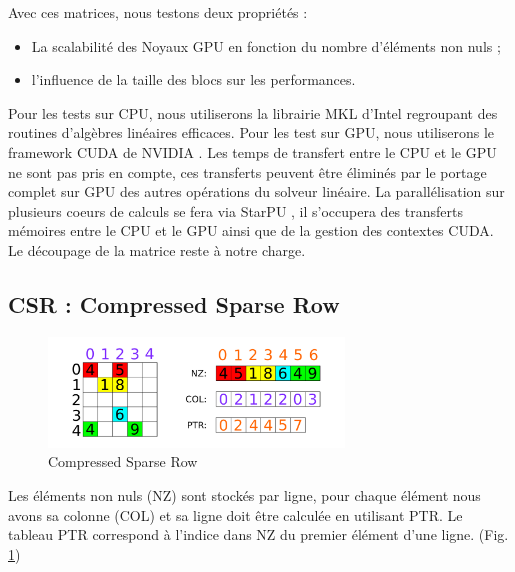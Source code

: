 \documentclass[renpar]{compas2013}
\begin{document}
    Avec ces matrices, nous testons deux propriétés :
    \begin{itemize}
      \item La scalabilité des Noyaux GPU en fonction du nombre d'éléments non nuls ;
      \item l'influence de la taille des blocs sur les performances.
    \end{itemize}
    
    Pour les tests sur CPU, nous utiliserons la librairie MKL d'Intel \cite{MKL} regroupant des
    routines d'algèbres linéaires efficaces. Pour les test sur GPU, nous utiliserons
    le framework CUDA de NVIDIA \cite{CUDA}. Les temps de transfert entre le CPU et le GPU ne sont
    pas pris en compte, ces transferts peuvent être éliminés par le portage complet sur GPU des
    autres opérations du solveur linéaire. La parallélisation sur plusieurs coeurs de calculs
    se fera via StarPU \cite{AugThiNamWac11CCPE}, il s'occupera des transferts mémoires entre le CPU
    et le GPU ainsi que de la gestion des contextes CUDA. Le découpage de la matrice reste à notre charge.
    
    
    \subsection{CSR : Compressed Sparse Row}
    
    \begin{figure}\begin{center}
        \includegraphics[width=0.7\textwidth]{images/CSR.pdf}
        \caption{Compressed Sparse Row}
        \label{csr_info}
    \end{center}\end{figure}
    
    Les éléments non nuls (NZ) sont stockés par ligne, pour chaque élément nous
    avons sa colonne (COL) et sa ligne doit être calculée en utilisant
    PTR. Le tableau PTR correspond à l'indice dans NZ du premier élément
    d'une ligne. (Fig. \ref{csr_info})
    
\end{document}
